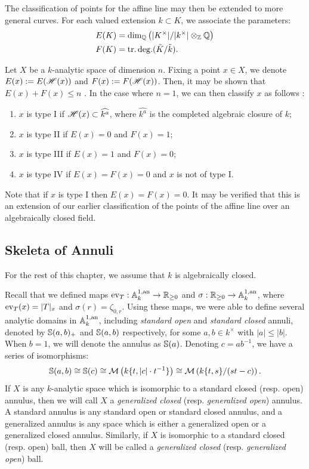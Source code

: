 The classification of points for the affine line may then be extended to more general curves.
For each valued extension $k \subset K$, we associate the parameters:
\begin{align*}
    & E(K) = \dim_{\mathbb{Q}}\left(|K^{\times}|/|k^{\times}| \otimes_{\mathbb{Z}} \mathbb{Q}\right) \\
    & F(K) = \operatorname{tr.deg.}(\tilde{K} / \tilde{k}).
\end{align*}

Let $X$ be a $k$-analytic space of dimension $n$.
Fixing a point $x \in X$, we denote $E(x) := E(\mathscr{H}(x))$ and $F(x) := F(\mathscr{H}(x))$.
Then, it may be shown that $E(x) + F(x) \leq n$ \parencite[Lemma 2.5.2]{berk93}.
In the case where $n = 1$, we can then classify $x$ as follows \parencite[\S 2.3.3]{temk}:
\begin{enumerate}
    \item $x$ is type I if $\mathscr{H}(x) \subset \widehat{k^a}$, where $\widehat{k^a}$ is the completed algebraic closure of $k$;
    \item $x$ is type II if $E(x) = 0$ and $F(x) = 1$; 
    \item $x$ is type III if $E(x) = 1$ and $F(x) = 0$;
    \item $x$ is type IV if $E(x) = F(x) = 0$ and $x$ is not of type I.
\end{enumerate}

Note that if $x$ is type I then $E(x) = F(x) = 0$.
It may be verified that this is an extension of our earlier classification of the points of the affine line over an algebraically closed field.

\subsection{Skeleta of Annuli}

For the rest of this chapter, we assume that $k$ is algebraically closed.

Recall that we defined maps $\operatorname{ev}_{T}: \mathbb{A}^{1, \text{an}}_{k} \to \mathbb{R}_{\geq 0}$ and $\sigma: \mathbb{R}_{\geq 0} \to \mathbb{A}^{1, \text{an}}_{k}$, where $\operatorname{ev}_{T}(x) = |T|_x$ and $\sigma(r) = \zeta_{0, r}$.
Using these maps, we were able to define several analytic domains in $\mathbb{A}^{1, \text{an}}_{k}$, including \textit{standard open} and \textit{standard closed} annuli, denoted by $\mathbb{S}(a, b)_{+}$ and $\mathbb{S}(a, b)$ respectively, for some $a, b \in k^{\times}$ with $|a| \leq |b|$.
When $b = 1$, we will denote the annulus as $\mathbb{S}(a)$.
Denoting $c = ab^{-1}$, we have a series of isomorphisms:
\[\mathbb{S}(a, b) \cong \mathbb{S}(c) \cong \mathcal{M}\left(k\{t, |c| \cdot t^{-1}\}\right) \cong \mathcal{M}\left(k\{t, s\}/(st - c)\right). \]
If $X$ is any $k$-analytic space which is isomorphic to a standard closed (resp. open) annulus, then we will call $X$ a \textit{generalized closed} (resp. \textit{generalized open}) annulus.
A standard annulus is any standard open or standard closed annulus, and a generalized annulus is any space which is either a generalized open or a generalized closed annulus.
Similarly, if $X$ is isomorphic to a standard closed (resp. open) ball, then $X$ will be called a \textit{generalized closed} (resp. \textit{generalized open}) ball.


